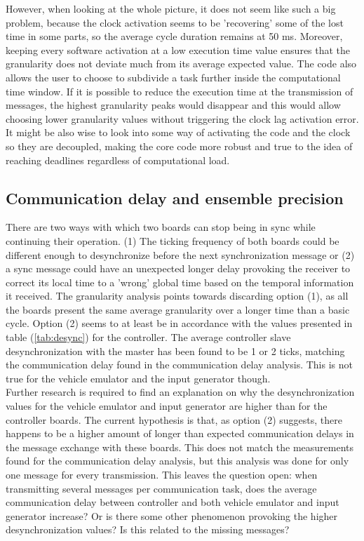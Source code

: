 \documentclass[table,xcdraw]{article}
\begin{document}
However, when looking at the whole picture, it does not seem like such a big problem, because the clock activation seems to be 'recovering' some of the lost time in some parts, so the average cycle duration remains at 50 ms. Moreover, keeping every software activation at a low execution time value ensures that the granularity does not deviate much from its average expected value. The code also allows the user to choose to subdivide a task further inside the computational time window. If it is possible to reduce the execution time at the transmission of messages, the highest granularity peaks would disappear and this would allow choosing lower granularity values without triggering the clock lag activation error. It might be also wise to look into some way of activating the code and the clock so they are decoupled, making the core code more robust and true to the idea of reaching deadlines regardless of computational load.

\subsection{Communication delay and ensemble precision}
There are two ways with which two boards can stop being in sync while continuing their operation. (1) The ticking frequency of both boards could be different enough to desynchronize before the next synchronization message or (2) a sync message could have an unexpected longer delay provoking the receiver to correct its local time to a 'wrong' global time based on the temporal information it received. The granularity analysis points towards discarding option (1), as all the boards present the same average granularity over a longer time than a basic cycle. Option (2) seems to at least be in accordance with the values presented in table (\ref{tab:desync}) for the controller. The average controller slave desynchronization with the master has been found to be 1 or 2 ticks, matching the communication delay found in the communication delay analysis. This is not true for the vehicle emulator and the input generator though.\\

Further research is required to find an explanation on why the desynchronization values for the vehicle emulator and input generator are higher than for the controller boards. The current hypothesis is that, as option (2) suggests, there happens to be a higher amount of longer than expected communication delays in the message exchange with these boards. This does not match the measurements found for the communication delay analysis, but this analysis was done for only one message for every transmission. This leaves the question open: when transmitting several messages per communication task, does the average communication delay between controller and both vehicle emulator and input generator increase? Or is there some other phenomenon provoking the higher desynchronization values? Is this related to the missing messages?
\end{document}

